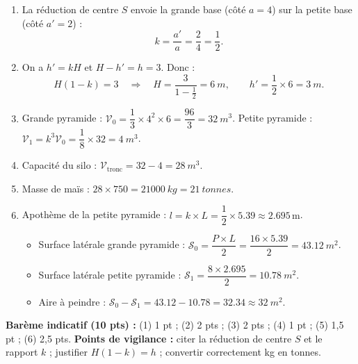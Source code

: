 \documentclass[11pt]{article}
\begin{document}
\begin{corrige}
\begin{enumerate}
    \item La réduction de centre $S$ envoie la grande base (côté $a = 4$) sur la petite base (côté $a' = 2$) :
    \[
    k = \frac{a'}{a} = \frac{2}{4} = \frac{1}{2}.
    \]
    \item On a $h' = kH$ et $H - h' = h = 3$. Donc :
    \[
    H(1 - k) = 3 \quad \Rightarrow \quad H = \frac{3}{1 - \frac{1}{2}} = \SI{6}{m}, \qquad h' = \frac{1}{2} \times 6 = \SI{3}{m}.
    \]
    \item Grande pyramide : $\mathcal{V}_0 = \dfrac{1}{3} \times 4^2 \times 6 = \dfrac{96}{3} = \SI{32}{m^3}$.
    Petite pyramide : $\mathcal{V}_1 = k^3 \mathcal{V}_0 = \dfrac{1}{8} \times 32 = \SI{4}{m^3}$.
    \item Capacité du silo : $\mathcal{V}_{\text{tronc}} = 32 - 4 = \SI{28}{m^3}$.
    \item Masse de maïs : $28 \times 750 = \SI{21000}{kg} = \SI{21}{tonnes}$.
    \item Apothème de la petite pyramide : $l = k \times L = \dfrac{1}{2} \times \num{5,39} \approx \num{2,695}\,\text{m}$.
    \begin{itemize}
        \item Surface latérale grande pyramide : $\mathcal{S}_0 = \dfrac{P \times L}{2} = \dfrac{16 \times \num{5,39}}{2} = \SI{43,12}{m^2}$.
        \item Surface latérale petite pyramide : $\mathcal{S}_1 = \dfrac{8 \times \num{2,695}}{2} = \SI{10,78}{m^2}$.
        \item Aire à peindre : $\mathcal{S}_0 - \mathcal{S}_1 = \num{43,12} - \num{10,78} = \num{32,34} \approx \SI{32}{m^2}$.
    \end{itemize}
\end{enumerate}
\textbf{Barème indicatif (10 pts) :} (1) 1 pt ; (2) 2 pts ; (3) 2 pts ; (4) 1 pt ; (5) 1,5 pt ; (6) 2,5 pts.
\textbf{Points de vigilance :} citer la réduction de centre $S$ et le rapport $k$ ; justifier $H(1-k) = h$ ; convertir correctement kg en tonnes.
\end{corrige}
\end{document}
